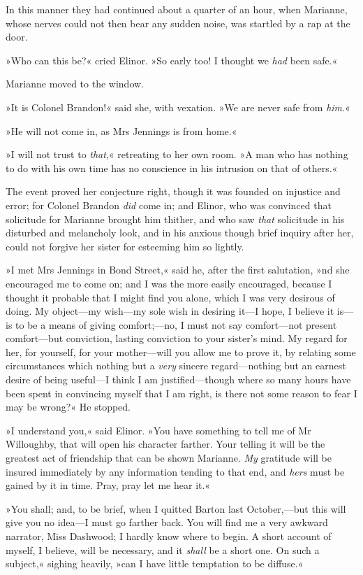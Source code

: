 In this manner they had continued about a quarter of an hour, when Marianne, whose nerves could not then bear any sudden noise, was startled by a rap at the door.

»Who can this be?« cried Elinor. »So early too! I thought we \textit{had} been safe.«

Marianne moved to the window.

»It is Colonel Brandon!« said she, with vexation. »We are never safe from \textit{him}.«

»He will not come in, as Mrs Jennings is from home.«

»I will not trust to \textit{that},« retreating to her own room. »A man who has nothing to do with his own time has no conscience in his intrusion on that of others.«

The event proved her conjecture right, though it was founded on injustice and error; for Colonel Brandon \textit{did} come in; and Elinor, who was convinced that solicitude for Marianne brought him thither, and who saw \textit{that} solicitude in his disturbed and melancholy look, and in his anxious though brief inquiry after her, could not forgive her sister for esteeming him so lightly.

»I met Mrs Jennings in Bond Street,« said he, after the first salutation, »nd she encouraged me to come on; and I was the more easily encouraged, because I thought it probable that I might find you alone, which I was very desirous of doing. My object—my wish—my sole wish in desiring it—I hope, I believe it is—is to be a means of giving comfort;—no, I must not say comfort—not present comfort—but conviction, lasting conviction to your sister’s mind. My regard for her, for yourself, for your mother—will you allow me to prove it, by relating some circumstances which nothing but a \textit{very} sincere regard—nothing but an earnest desire of being useful—I think I am justified—though where so many hours have been spent in convincing myself that I am right, is there not some reason to fear I may be wrong?« He stopped.

»I understand you,« said Elinor. »You have something to tell me of Mr Willoughby, that will open his character farther. Your telling it will be the greatest act of friendship that can be shown Marianne. \textit{My} gratitude will be insured immediately by any information tending to that end, and \textit{hers} must be gained by it in time. Pray, pray let me hear it.«

»You shall; and, to be brief, when I quitted Barton last October,—but this will give you no idea—I must go farther back. You will find me a very awkward narrator, Miss Dashwood; I hardly know where to begin. A short account of myself, I believe, will be necessary, and it \textit{shall} be a short one. On such a subject,« sighing heavily, »can I have little temptation to be diffuse.«

